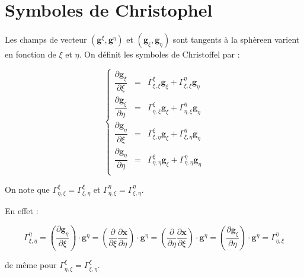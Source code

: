 \section{Symboles de Christophel}

Les champs de vecteur $( \mathbf{g}^{\xi}, \mathbf{g}^{\eta})$ et $( \mathbf{g}_ {\xi}, \mathbf{g}_{\eta})$ sont tangents à la sphèreen varient en fonction de $\xi$ et $\eta$. On définit les symboles de Christoffel par :

\begin{equation}
\left\lbrace
\begin{array}{rcl}
\dfrac{\partial \mathbf{g}_{\xi}}{\partial \xi} & = & \Gamma_{\xi,\xi}^{\xi} \mathbf{g}_{\xi} + \Gamma_{\xi,\xi}^{\eta} \mathbf{g}_{\eta}\\

\dfrac{\partial \mathbf{g}_{\xi}}{\partial \eta} & = & \Gamma_{\eta,\xi}^{\xi} \mathbf{g}_{\xi} + \Gamma_{\eta,\xi}^{\eta} \mathbf{g}_{\eta}\\

\dfrac{\partial \mathbf{g}_{\eta}}{\partial \xi} & = & \Gamma_{\xi,\eta}^{\xi} \mathbf{g}_{\xi} + \Gamma_{\xi,\eta}^{\eta} \mathbf{g}_{\eta}\\

\dfrac{\partial \mathbf{g}_{\eta}}{\partial \eta} & = & \Gamma_{\eta,\eta}^{\xi} \mathbf{g}_{\xi} + \Gamma_{\eta,\eta}^{\eta} \mathbf{g}_{\eta}\\
\end{array}
\right.
\end{equation}

\begin{remarque}
On note que $\Gamma_{\eta,\xi}^{\xi}=\Gamma_{\xi,\eta}^{\xi}$ et $\Gamma_{\eta,\xi}^{\eta}=\Gamma_{\xi,\eta}^{\eta}$.

En effet :

$$\Gamma_{\xi, \eta}^{\eta} = \left( \dfrac{\partial \mathbf{g}_{\eta}}{\partial \xi} \right) \cdot \mathbf{g}^{\eta} = \left( \dfrac{\partial}{\partial \xi} \dfrac{\partial \mathbf{x}}{\partial \eta} \right) \cdot \mathbf{g}^{\eta} = \left( \dfrac{\partial}{\partial \eta} \dfrac{\partial \mathbf{x}}{\partial \xi} \right) \cdot \mathbf{g}^{\eta} = \left( \dfrac{\partial \mathbf{g}_{\xi}}{\partial \eta} \right) \cdot \mathbf{g}^{\eta} = \Gamma_{\eta, \xi}^{\eta}$$

de même pour $\Gamma_{\eta,\xi}^{\xi}=\Gamma_{\xi,\eta}^{\xi}$.
\end{remarque}




